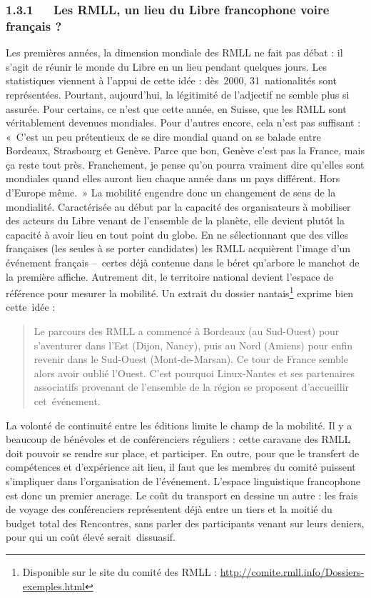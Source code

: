 \documentclass{FramateX}
\begin{document}
\begin{refsection}
\subsubsection*{1.3.1~~~Les RMLL, un lieu du Libre francophone voire français ?}
{}

Les premières années, la dimension mondiale des RMLL ne fait pas débat :
il s'agit de réunir le monde du Libre en un lieu pendant quelques
jours. Les statistiques viennent à l'appui de cette idée : dès~2000,
31~nationalités sont représentées. Pourtant, aujourd'hui, la légitimité
de l'adjectif ne semble plus si assurée. Pour certains, ce n'est que
cette année, en Suisse, que les RMLL sont véritablement devenues
mondiales. Pour d'autres encore, cela n'est pas suffisant :
«~C'est un peu prétentieux de se dire mondial quand
on se balade entre Bordeaux, Strasbourg et Genève. Parce que bon,
Genève c'est pas la France, mais ça reste tout près. Franchement, je
pense qu'on pourra vraiment dire qu'elles sont mondiales quand elles
auront lieu chaque année dans un pays différent. Hors d'Europe même.~»
La mobilité engendre donc un changement de sens de la mondialité.
Caractérisée au début par la capacité des organisateurs à mobiliser des
acteurs du Libre venant de l'ensemble de la planète, elle devient
plutôt la capacité à avoir lieu en tout point du globe. En ne
sélectionnant que des villes françaises (les seules à se porter
candidates) les RMLL acquièrent l'image d'un événement français
 –~certes déjà
contenue dans le béret qu'arbore le manchot de la première affiche.
Autrement dit, le territoire national devient l'espace de référence
pour mesurer la mobilité. Un extrait du dossier
nantais\footnote{Disponible sur le site du comité des RMLL :
\url{http://comite.rmll.info/Dossiers-exemples.html} } exprime bien
cette~idée :

\begin{quote}
Le parcours des RMLL a commencé à Bordeaux (au Sud-Ouest) pour
s'aventurer dans l'Est (Dijon, Nancy), puis au Nord (Amiens) pour enfin
revenir dans le Sud-Ouest (Mont-de-Marsan). Ce tour de France semble
alors avoir oublié l'Ouest. C'est pourquoi Linux-Nantes et ses
partenaires associatifs provenant de l'ensemble de la région se
proposent d'accueillir cet~événement.
\end{quote}

La volonté de continuité entre les éditions limite le champ de la
mobilité. Il y a beaucoup de bénévoles et de conférenciers réguliers :
cette caravane des RMLL doit pouvoir se rendre sur place, et
participer. En outre, pour que le transfert de compétences et
d'expérience ait lieu, il faut que les membres du comité puissent
s'impliquer dans l'organisation de l'événement. L'espace linguistique
francophone est donc un premier ancrage. Le coût du transport en
dessine un autre : les frais de voyage des conférenciers représentent
déjà entre un tiers et la moitié du budget total des Rencontres, sans
parler des participants venant sur leurs deniers, pour qui un coût
élevé serait~dissuasif.


\end{refsection}
\end{document}
